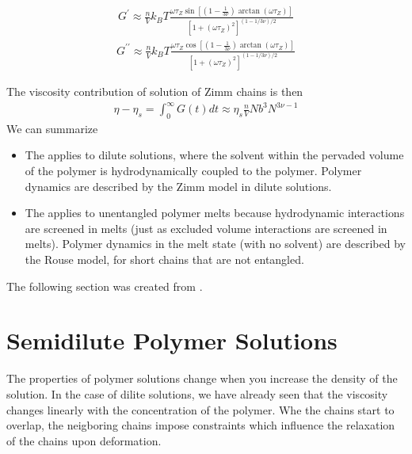 \documentclass[letterpaper,10pt,english]{sphinxmanual}
\begin{document}
\sphinxAtStartPar
{}
\begin{equation*}
\begin{split}G^{\prime}\approx \frac{n}{V}k_B T \frac{\omega \tau_Z \sin\left [(1-\frac{1}{3\nu})\arctan(\omega \tau_Z) \right ]}{\left [ 1+(\omega \tau_Z)^2\right ]^{(1-1/3\nu)/2}}\end{split}
\end{equation*}
\sphinxAtStartPar
{}
\begin{equation*}
\begin{split}G^{\prime\prime}\approx \frac{n}{V}k_B T \frac{\omega \tau_Z \cos\left [(1-\frac{1}{3\nu})\arctan(\omega \tau_Z) \right ]}{\left [ 1+(\omega \tau_Z)^2\right ]^{(1-1/3\nu)/2}}\end{split}
\end{equation*}
\noindent{}

\sphinxAtStartPar
The viscosity contribution of solution of Zimm chains is then
\begin{equation*}
\begin{split}\eta-\eta_s=\int_0^{\infty}G(t)dt \approx \eta_s \frac{n}{V}Nb^{3}N^{3\nu-1}\end{split}
\end{equation*}
\sphinxAtStartPar
We can summarize
\begin{itemize}
\item {} 
\sphinxAtStartPar
The  applies to dilute solutions, where the solvent within the pervaded volume of the polymer is hydrodynamically coupled to the polymer. Polymer dynamics are described by the Zimm model in dilute solutions.

\item {} 
\sphinxAtStartPar
The  applies to unentangled polymer melts because hydrodynamic interactions are screened in melts (just as excluded volume interactions are screened in melts). Polymer dynamics in the melt state (with no solvent) are described by the Rouse model, for short chains that are not entangled.

\end{itemize}



\sphinxAtStartPar
The following section was created from .


\chapter{Semidilute Polymer Solutions}
\label{\detokenize{notebooks/L26/1_semidilute_polymers:Semidilute-Polymer-Solutions}}\label{\detokenize{notebooks/L26/1_semidilute_polymers::doc}}
\sphinxAtStartPar
The properties of polymer solutions change when you increase the density of the solution. In the case of dilite solutions, we have already seen that the viscosity changes linearly with the concentration of the polymer. Whe the chains start to overlap, the neigboring chains impose constraints which influence the relaxation of the chains upon deformation.
\end{document}
